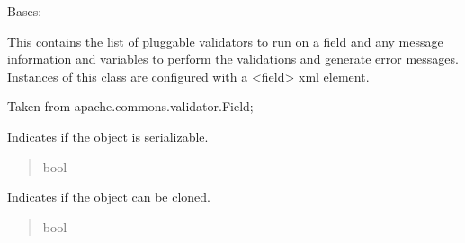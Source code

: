 \documentclass[letterpaper,10pt,english]{sphinxmanual}
\begin{document}
\begin{fulllineitems}
\label{\detokenize{apache_commons_validator_python:apache_commons_validator_python.field_new.Field}}
\pysigstartsignatures
{}
\pysigstopsignatures
\sphinxAtStartPar
Bases: 

\sphinxAtStartPar
This contains the list of pluggable validators to run on a field and any message
information and variables to perform the validations and generate error messages.
Instances of this class are configured with a \textless{}field\textgreater{} xml element.

\sphinxAtStartPar
Taken from apache.commons.validator.Field;

\begin{fulllineitems}
\label{\detokenize{apache_commons_validator_python:apache_commons_validator_python.field_new.Field.serializable}}
\pysigstartsignatures
{}
\pysigstopsignatures
\sphinxAtStartPar
Indicates if the object is serializable.
\begin{quote}\begin{description}
\sphinxAtStartPar
bool

\end{description}\end{quote}

\end{fulllineitems}


\begin{fulllineitems}
\label{\detokenize{apache_commons_validator_python:apache_commons_validator_python.field_new.Field.cloneable}}
\pysigstartsignatures
{}
\pysigstopsignatures
\sphinxAtStartPar
Indicates if the object can be cloned.
\begin{quote}\begin{description}
\sphinxAtStartPar
bool


\end{description}
\end{quote}
\end{fulllineitems}
\end{fulllineitems}
\end{document}
